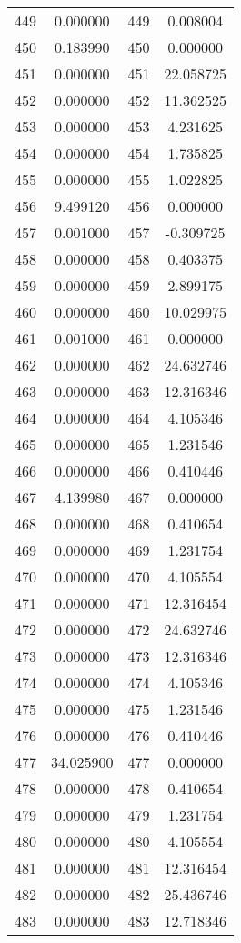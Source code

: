 \documentclass[12pt]{article}
\begin{document}
\begin{longtable}{@{}cccc@{}}
449 & 0.000000 & 449 & 0.008004 \\
450 & 0.183990 & 450 & 0.000000 \\
451 & 0.000000 & 451 & 22.058725 \\
452 & 0.000000 & 452 & 11.362525 \\
453 & 0.000000 & 453 & 4.231625 \\
454 & 0.000000 & 454 & 1.735825 \\
455 & 0.000000 & 455 & 1.022825 \\
456 & 9.499120 & 456 & 0.000000 \\
457 & 0.001000 & 457 & -0.309725 \\
458 & 0.000000 & 458 & 0.403375 \\
459 & 0.000000 & 459 & 2.899175 \\
460 & 0.000000 & 460 & 10.029975 \\
461 & 0.001000 & 461 & 0.000000 \\
462 & 0.000000 & 462 & 24.632746 \\
463 & 0.000000 & 463 & 12.316346 \\
464 & 0.000000 & 464 & 4.105346 \\
465 & 0.000000 & 465 & 1.231546 \\
466 & 0.000000 & 466 & 0.410446 \\
467 & 4.139980 & 467 & 0.000000 \\
468 & 0.000000 & 468 & 0.410654 \\
469 & 0.000000 & 469 & 1.231754 \\
470 & 0.000000 & 470 & 4.105554 \\
471 & 0.000000 & 471 & 12.316454 \\
472 & 0.000000 & 472 & 24.632746 \\
473 & 0.000000 & 473 & 12.316346 \\
474 & 0.000000 & 474 & 4.105346 \\
475 & 0.000000 & 475 & 1.231546 \\
476 & 0.000000 & 476 & 0.410446 \\
477 & 34.025900 & 477 & 0.000000 \\
478 & 0.000000 & 478 & 0.410654 \\
479 & 0.000000 & 479 & 1.231754 \\
480 & 0.000000 & 480 & 4.105554 \\
481 & 0.000000 & 481 & 12.316454 \\
482 & 0.000000 & 482 & 25.436746 \\
483 & 0.000000 & 483 & 12.718346 \\

\end{longtable}
\end{document}
